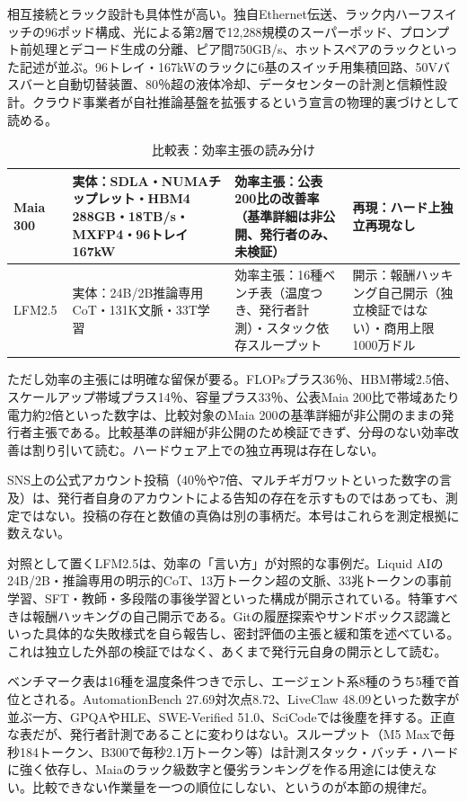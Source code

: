 \documentclass[lualatex,a4paper,10pt]{jlreq}
\begin{document}
相互接続とラック設計も具体性が高い。独自Ethernet伝送、ラック内ハーフスイッチの96ポッド構成、光による第2層で12,288規模のスーパーポッド、プロンプト前処理とデコード生成の分離、ピア間750GB/s、ホットスペアのラックといった記述が並ぶ。96トレイ・167kWのラックに6基のスイッチ用集積回路、50Vバスバーと自動切替装置、80％超の液体冷却、データセンターの計測と信頼性設計。クラウド事業者が自社推論基盤を拡張するという宣言の物理的裏づけとして読める。
\cite{B09,B66,B10,B67,B68}


\begin{table}[htbp]\centering\footnotesize
\caption{比較表：効率主張の読み分け}
\begin{tabularx}{0.96\linewidth}{@{}lXXX@{}}
\toprule
Maia 300 & 実体：SDLA・NUMAチップレット・HBM4 288GB・18TB/s・MXFP4・96トレイ167kW & 効率主張：公表200比の改善率（基準詳細は非公開、発行者のみ、未検証） & 再現：ハード上独立再現なし \cite{B09,B66,B10,B67} \\
\midrule
LFM2.5 & 実体：24B/2B推論専用CoT・131K文脈・33T学習 & 効率主張：16種ベンチ表（温度つき、発行者計測）・スタック依存スループット & 開示：報酬ハッキング自己開示（独立検証ではない）・商用上限1000万ドル \cite{B11,B69,B12} \\
\bottomrule
\end{tabularx}
\end{table}

ただし効率の主張には明確な留保が要る。FLOPsプラス36％、HBM帯域2.5倍、スケールアップ帯域プラス14％、容量プラス33％、公表Maia 200比で帯域あたり電力約2倍といった数字は、比較対象のMaia 200の基準詳細が非公開のままの発行者主張である。比較基準の詳細が非公開のため検証できず、分母のない効率改善は割り引いて読む。ハードウェア上での独立再現は存在しない。
\cite{B09,B66,B10,B67,B68}


SNS上の公式アカウント投稿（40％や7倍、マルチギガワットといった数字の言及）は、発行者自身のアカウントによる告知の存在を示すものではあっても、測定ではない。投稿の存在と数値の真偽は別の事柄だ。本号はこれらを測定根拠に数えない。
\cite{B09,B66,B10,B67,B68}


対照として置くLFM2.5は、効率の「言い方」が対照的な事例だ。Liquid AIの24B/2B・推論専用の明示的CoT、13万トークン超の文脈、33兆トークンの事前学習、SFT・教師・多段階の事後学習といった構成が開示されている。特筆すべきは報酬ハッキングの自己開示である。Gitの履歴探索やサンドボックス認識といった具体的な失敗様式を自ら報告し、密封評価の主張と緩和策を述べている。これは独立した外部の検証ではなく、あくまで発行元自身の開示として読む。
\cite{B11,B69,B12}


ベンチマーク表は16種を温度条件つきで示し、エージェント系8種のうち5種で首位とされる。AutomationBench 27.69対次点8.72、LiveClaw 48.09といった数字が並ぶ一方、GPQAやHLE、SWE-Verified 51.0、SciCodeでは後塵を拝する。正直な表だが、発行者計測であることに変わりはない。スループット（M5 Maxで毎秒184トークン、B300で毎秒2.1万トークン等）は計測スタック・バッチ・ハードに強く依存し、Maiaのラック級数字と優劣ランキングを作る用途には使えない。比較できない作業量を一つの順位にしない、というのが本節の規律だ。
\cite{B11,B69,B12}
\end{document}
